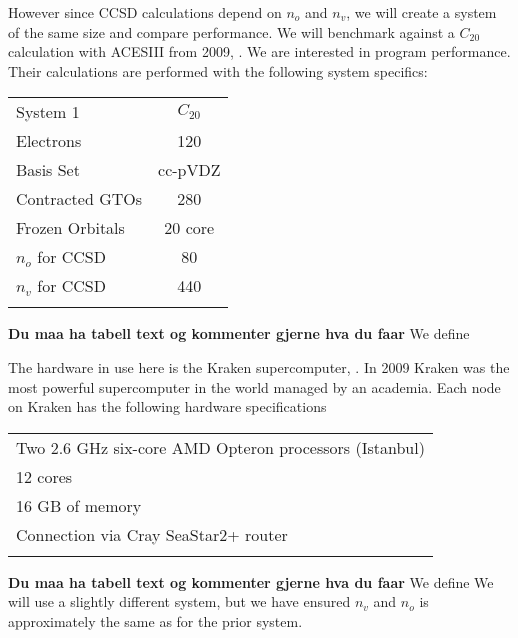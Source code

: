 However since CCSD calculations depend on $n_o$ and $n_v$, we will
create a system of the same size and compare performance. We will
benchmark against a $C_{20}$ calculation with ACESIII from 2009,
\cite{aces_non_ref}. We are interested in program performance. Their
calculations are performed with the following system specifics: \\

\begin{center}
\begin{tabular}{ l c}
	\hline
  	System 1 & $C_{20}$\\
  	Electrons & 120 \\
  	Basis Set & cc-pVDZ\\
  	Contracted GTOs & 280 \\
  	Frozen Orbitals & 20 core\\
  	$n_o$ for CCSD & 80\\
  	$n_v$ for CCSD & 440\\ \hline
  	\\
	\end{tabular}
\end{center}
{\bf Du maa ha tabell text og kommenter gjerne hva du faar} We define

The hardware in use here is the Kraken supercomputer, \cite{kraken_citation}. In 2009 Kraken was the most powerful supercomputer in the world managed by an academia. Each node on Kraken has the following hardware specifications

\begin{center}
\begin{tabular}{ l }
	\hline
  	Two 2.6 GHz six-core AMD Opteron processors (Istanbul)\\
    12 cores\\
    16 GB of memory\\
    Connection via Cray SeaStar2+ router\\ \hline
  	\\
	\end{tabular}
\end{center}
{\bf Du maa ha tabell text og kommenter gjerne hva du faar} We define
We will use a slightly different system, but we have ensured $n_v$ and
$n_o$ is approximately the same as for the prior system.

